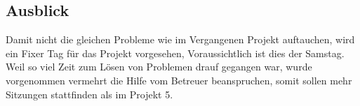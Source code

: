 \subsection{Ausblick}
Damit nicht die gleichen Probleme wie im Vergangenen Projekt auftauchen, wird ein Fixer Tag für das Projekt vorgesehen, Voraussichtlich ist dies der Samstag. Weil so viel Zeit zum Lösen von Problemen drauf gegangen war, wurde vorgenommen vermehrt die Hilfe vom Betreuer beanspruchen, somit sollen mehr Sitzungen stattfinden als im Projekt 5.

